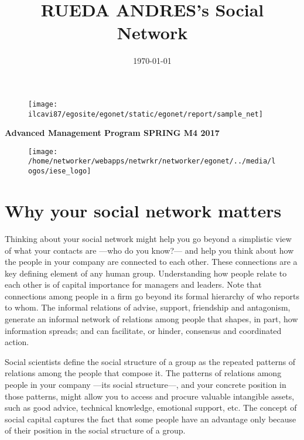 \documentclass[a4paper,12pt]{article}
\title{\Huge{RUEDA ANDRES's Social Network}}
\date{\today}
\begin{document}
\clearpage
\thispagestyle{empty}

\maketitle


\begin{figure}[H]
\centering
\texttt{[image: ilcavi87/egosite/egonet/static/egonet/report/sample\_net]}
\end{figure}


\begin{center}
\Large{\textbf{Advanced Management Program SPRING M4 2017}}


\begin{figure}[H]
\centering
\texttt{[image: /home/networker/webapps/netwrkr/networker/egonet/../media/logos/iese\_logo]}
\end{figure}

\small{}
\end{center}

\newpage
\clearpage
{}


\section*{Why your social network matters}


Thinking about your social network might help you go beyond a simplistic view of what your contacts are ---who do you know?--- and help you think about how the people in your company are connected to each other. These connections are a key defining element of any human group. Understanding how people relate to each other is of capital importance for managers and leaders. Note that connections among people in a firm go beyond its formal hierarchy of who reports to whom. The informal relations of advise, support, friendship and antagonism, generate an informal network of relations among people that shapes, in part, how information spreads; and can facilitate, or hinder, consensus and coordinated action.

Social scientists define the social structure of a group as the repeated patterns of relations among the people that compose it. The patterns of relations among people in your company ---its social structure---, and your concrete position in those patterns, might allow you to access and procure valuable intangible assets, such as good advice, technical knowledge, emotional support, etc. The concept of social capital captures the fact that some people have an advantage only because of their position in the social structure of a group.
\end{document}
